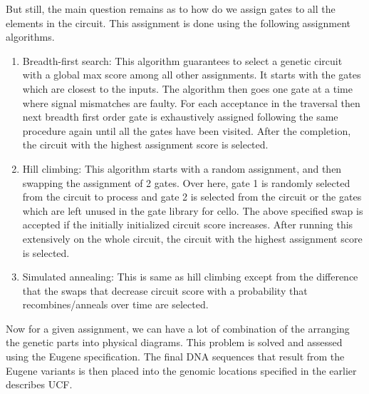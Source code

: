 \documentclass[11pt]{article}
\begin{document}
But still, the main question remains as to how do we assign gates to all the elements in the circuit. This assignment is done using the following assignment algorithms.
\begin{enumerate}
\item Breadth-first search: 
This algorithm guarantees to select a genetic circuit with  a global max score among all other assignments. It starts with the gates which are closest to the inputs. The algorithm then goes one gate at a time where signal mismatches are faulty. For each acceptance in the traversal then next breadth first order gate is exhaustively assigned following the same procedure again until all the gates have been visited. After the completion, the circuit with the highest assignment score is selected.  
\item Hill climbing: 
This algorithm starts with a random assignment, and then swapping the assignment of 2 gates. Over here, gate 1 is randomly selected from the circuit to process and gate 2 is selected from the circuit or the gates which are left unused in the gate library for cello. The above specified swap is accepted if the initially initialized circuit score increases. After running this extensively on the whole circuit, the circuit with the highest assignment score is selected.
\item Simulated annealing: 
This is same as hill climbing except from the difference that the swaps that decrease circuit score with a probability that recombines/anneals over time are selected.
\end{enumerate}
Now for a given assignment, we can have a lot of combination of the arranging the genetic parts into physical diagrams. This problem is solved and assessed using the Eugene specification. The final DNA sequences that result from the Eugene variants is then placed into the genomic locations specified in the earlier describes UCF.   
\end{document}
